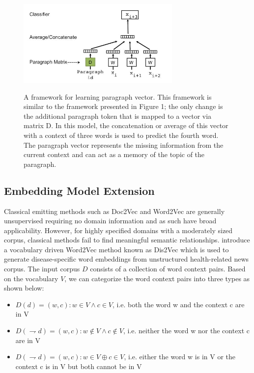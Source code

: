 \documentclass[12pt,a4paper] {article}
\begin{document}
	
	\begin{figure}[h]
		\centering
		\includegraphics[width=8cm, height=5cm]{para}
		\caption[]{A framework for learning paragraph vector. This framework
			is similar to the framework presented in Figure 1; the only
			change is the additional paragraph token that is mapped to a vector
			via matrix D. In this model, the concatenation or average of
			this vector with a context of three words is used to predict the
			fourth word. The paragraph vector represents the missing information
			from the current context and can act as a memory of the
			topic of the paragraph.}
		\label{fig:doc2vec model}
	\end{figure}
	
	\subsection*{Embedding Model Extension}
	
	Classical emitting methods such as Doc2Vec and Word2Vec are generally unsupervised requiring no domain information and as such have broad
	applicability. However, for highly specified domains with a moderately sized corpus, classical methods fail to find meaningful semantic relationships. 
	\cite{ghosh2016characterizing} introduce a vocabulary driven Word2Vec method known as Dis2Vec which is used to generate disease-specific word embeddings from unstructured health-related news corpus. The input corpus $D$ consists of a collection of word context pairs. Based on the vocabulary $ V$, we can categorize the word context pairs into three types as shown
	below:
	\\
	\begin{itemize}
		\item $ D(d) = {(w, c): w \in V ∧c \in V }$, i.e. both the word w and the context c are in V
		\item $D(\rightharpoondown d) = {(w, c): w \notin V ∧c \notin V }$, i.e. neither the word w nor the context c are in V
		\item $D(\rightharpoondown d) = {(w, c): w \in V \oplus c \in V }$, i.e. either the word w is in V or the context c is in V but both cannot be in V
	\end{itemize}
	
\end{document}
